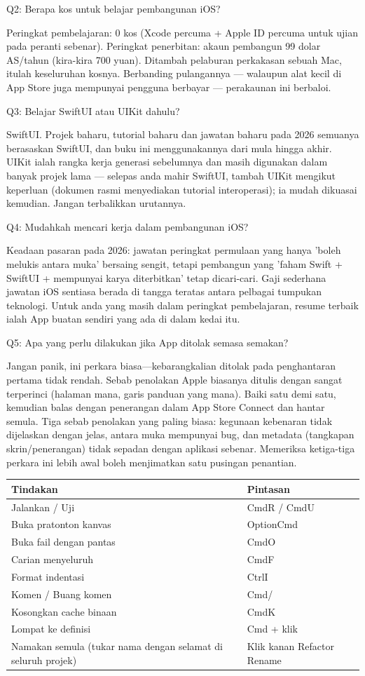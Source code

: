 Q2: Berapa kos untuk belajar pembangunan iOS?

Peringkat pembelajaran: 0 kos (Xcode percuma + Apple ID percuma untuk ujian pada peranti sebenar). Peringkat penerbitan: akaun pembangun 99 dolar AS/tahun (kira-kira 700 yuan). Ditambah pelaburan perkakasan sebuah Mac, itulah keseluruhan kosnya. Berbanding pulangannya — walaupun alat kecil di App Store juga mempunyai pengguna berbayar — perakaunan ini berbaloi.

Q3: Belajar SwiftUI atau UIKit dahulu?

SwiftUI. Projek baharu, tutorial baharu dan jawatan baharu pada 2026 semuanya berasaskan SwiftUI, dan buku ini menggunakannya dari mula hingga akhir. UIKit ialah rangka kerja generasi sebelumnya dan masih digunakan dalam banyak projek lama — selepas anda mahir SwiftUI, tambah UIKit mengikut keperluan (dokumen rasmi menyediakan tutorial interoperasi); ia mudah dikuasai kemudian. Jangan terbalikkan urutannya.

Q4: Mudahkah mencari kerja dalam pembangunan iOS?

Keadaan pasaran pada 2026: jawatan peringkat permulaan yang hanya 'boleh melukis antara muka' bersaing sengit, tetapi pembangun yang 'faham Swift + SwiftUI + mempunyai karya diterbitkan' tetap dicari-cari. Gaji sederhana jawatan iOS sentiasa berada di tangga teratas antara pelbagai tumpukan teknologi. Untuk anda yang masih dalam peringkat pembelajaran, resume terbaik ialah App buatan sendiri yang ada di dalam kedai itu.

Q5: Apa yang perlu dilakukan jika App ditolak semasa semakan?

Jangan panik, ini perkara biasa—kebarangkalian ditolak pada penghantaran pertama tidak rendah. Sebab penolakan Apple biasanya ditulis dengan sangat terperinci (halaman mana, garis panduan yang mana). Baiki satu demi satu, kemudian balas dengan penerangan dalam App Store Connect dan hantar semula. Tiga sebab penolakan yang paling biasa: kegunaan kebenaran tidak dijelaskan dengan jelas, antara muka mempunyai bug, dan metadata (tangkapan skrin/penerangan) tidak sepadan dengan aplikasi sebenar. Memeriksa ketiga-tiga perkara ini lebih awal boleh menjimatkan satu pusingan penantian.


\begin{center}
\begin{tabularx}{\linewidth}{|X|X|}
\hline
\textbf{Tindakan} & \textbf{Pintasan} \tabularnewline
\hline
Jalankan / Uji & CmdR / CmdU \tabularnewline
Buka pratonton kanvas & OptionCmd \tabularnewline
Buka fail dengan pantas & CmdO \tabularnewline
Carian menyeluruh & CmdF \tabularnewline
Format indentasi & CtrlI \tabularnewline
Komen / Buang komen & Cmd/ \tabularnewline
Kosongkan cache binaan & CmdK \tabularnewline
Lompat ke definisi & Cmd + klik \tabularnewline
Namakan semula (tukar nama dengan selamat di seluruh projek) & Klik kanan Refactor Rename \tabularnewline
\hline
\end{tabularx}
\end{center}

